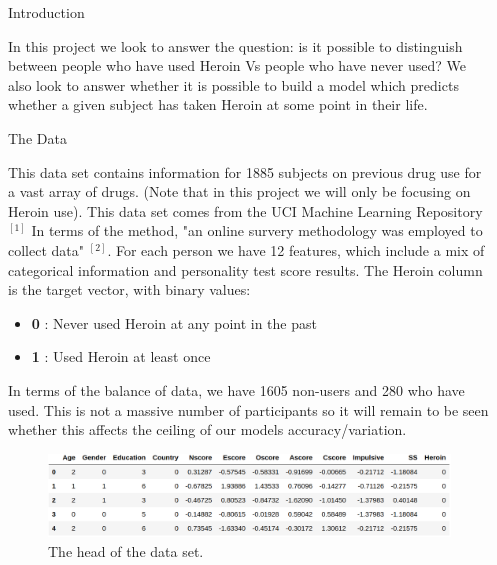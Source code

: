 \documentclass[6pt, final, xcolor=table]{beamer}
\newlength{\sepwidth}
\newlength{\colwidth}
\newcommand{\separatorcolumn}{\begin{column}{\sepwidth}\end{column}}
\begin{document}
\begin{frame}[t]
\begin{columns}[t]
\separatorcolumn

\begin{column}{\colwidth}

  \begin{alertblock}{Introduction}

   In this project we look to answer the question: is it possible to distinguish
   between people who have used Heroin Vs people who have never used? We also look 
   to answer whether it is possible to build a model which predicts whether a given subject has taken
   Heroin at some point in their life.
  \end{alertblock}

  \begin{block}{The Data}

 This data set contains information for 1885 
 subjects on previous drug use for a vast array of drugs. (Note that in this project we will only be focusing on Heroin use). This data set comes from the UCI Machine Learning Repository$^{[1]}$
 In terms of the method, "an online survery methodology was employed to collect data" $^{[2]}$.
 For each person we have 12 features, which include a mix of categorical
 information and personality test score results.
 The Heroin column is the target vector, with binary values:
 \begin{itemize}
     \item  \textbf{0} : Never used Heroin at any point in the past
     \item  \textbf{1} : Used Heroin at least once 
 \end{itemize}
In terms of the balance of data, we have 1605 non-users and 280 who have used.
This is not a massive number of participants so it will remain to be seen whether
this affects the ceiling of our models accuracy/variation.
 \begin{figure}[h!]
    \centering
     \includegraphics[scale=1.1]{df.png}
    \caption{The head of the data set.}
    \label{fig:dataset}
    \end{figure}
    

\end{block}
\end{column}
\end{columns}
\end{frame}
\end{document}
